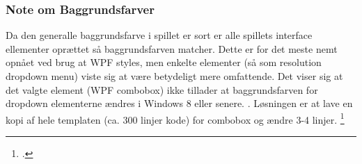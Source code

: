 \subsubsection{Note om Baggrundsfarver}
Da den generalle baggrundsfarve i spillet er sort er alle spillets interface ellementer oprættet så baggrundsfarven matcher. Dette er for det meste nemt opnået ved brug at WPF styles, men enkelte elementer (så som resolution dropdown menu) viste sig at være betydeligt mere omfattende. Det viser sig at det valgte element (WPF combobox) ikke tillader at baggrundsfarven for dropdown elementerne ændres i Windows 8 eller senere. . Løsningen er at lave en kopi af hele templaten (ca. 300 linjer kode) for combobox og ændre 3-4 linjer. \footcite{https://social.technet.microsoft.com/wiki/contents/articles/24240.changing-the-background-color-of-a-combobox-in-wpf-on-windows-8.aspx}

\newpage
